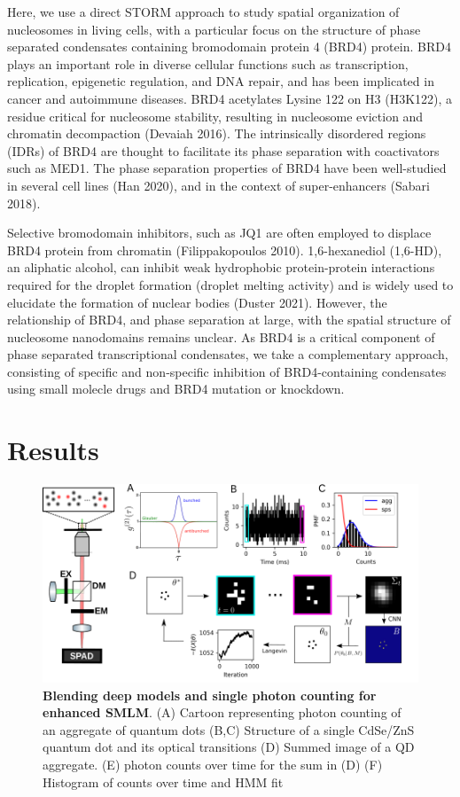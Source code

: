 \documentclass{ucetd}
\begin{document}
Here, we use a direct STORM approach to study spatial organization of nucleosomes in living cells, with a particular focus on the structure of phase separated condensates containing bromodomain protein 4 (BRD4) protein. BRD4 plays an important role in diverse cellular functions such as transcription, replication, epigenetic regulation, and DNA repair, and has been implicated in cancer and autoimmune diseases. BRD4 acetylates Lysine 122 on H3 (H3K122), a residue critical for nucleosome stability, resulting in nucleosome eviction and chromatin decompaction (Devaiah 2016). The intrinsically disordered regions (IDRs) of BRD4 are thought to facilitate its phase separation with coactivators such as MED1. The phase separation properties of BRD4 have been well-studied in several cell lines (Han 2020), and in the context of super-enhancers (Sabari 2018).

Selective bromodomain inhibitors, such as JQ1 are often employed to displace BRD4 protein from chromatin (Filippakopoulos 2010). 1,6-hexanediol (1,6-HD), an aliphatic alcohol, can inhibit weak hydrophobic protein-protein interactions required for the droplet formation (droplet melting activity) and is widely used to elucidate the formation of nuclear bodies (Duster 2021). However, the relationship of BRD4, and phase separation at large, with the spatial structure of nucleosome nanodomains remains unclear. As BRD4 is a critical component of phase separated transcriptional condensates, we take a complementary approach, consisting of specific and non-specific inhibition of BRD4-containing condensates using small molecle drugs and BRD4 mutation or knockdown.


\section{Results}

\begin{figure}
\begin{center}
\includegraphics[width=17cm]{SPAD.png}
\end{center}
\caption{\textbf{Blending deep models and single photon counting for enhanced SMLM}. (A) Cartoon representing photon counting of an aggregate of quantum dots (B,C) Structure of a single CdSe/ZnS quantum dot and its optical transitions (D) Summed image of a QD aggregate. (E) photon counts over time for the sum in (D) (F) Histogram of counts over time and HMM fit}
\end{figure}
\end{document}
